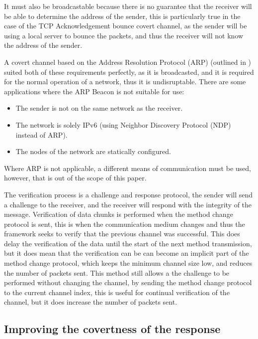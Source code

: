 It must also be broadcastable because there is no guarantee that the receiver will be able to determine the address of the sender, this is particularly true in the case of the TCP Acknowledgement bounce covert channel, as the sender will be using a local server to bounce the packets, and thus the receiver will not know the address of the sender.

A covert channel based on the Address Resolution Protocol (ARP) (outlined in ) suited both of these requirements perfectly, as it is broadcasted, and it is required for the normal operation of a network, thus it is undisruptable. There are some applications where the ARP Beacon is not suitable for use:

\begin{itemize}
    \item The sender is not on the same network as the receiver.
    \item The network is solely IPv6 (using Neighbor Discovery Protocol (NDP) instead of ARP).
    \item The nodes of the network are statically configured.
\end{itemize}

Where ARP is not applicable, a different means of communication must be used, however, that is out of the scope of this paper.

The verification process is a challenge and response protocol, the sender will send a challenge to the receiver, and the receiver will respond with the integrity of the message. Verification of data chunks is performed when the method change protocol is sent, this is when the communication medium changes and thus the framework seeks to verify that the previous channel was successful. This does delay the verification of the data until the start of the next method transmission, but it does mean that the verification can be can become an implicit part of the method change protocol, which keeps the minimum channel size low, and reduces the number of packets sent. This method still allows a 
the challenge to be performed without changing the channel, by sending the method change protocol to the current channel index, this is useful for continual verification of the channel, but it does increase the number of packets sent.

\subsection{Improving the covertness of the response}
\label{sec:improving_arp}

